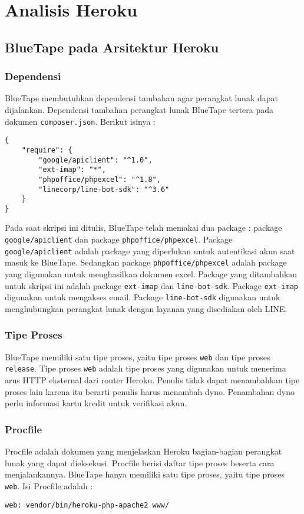\section{Analisis Heroku}
\label{sec:analisisheroku}
\subsection{BlueTape pada Arsitektur Heroku}
\subsubsection{Dependensi}
BlueTape membutuhkan dependensi tambahan agar perangkat lunak dapat dijalankan. Dependensi tambahan perangkat lunak BlueTape tertera pada dokumen \texttt{composer.json}. Berikut isinya :
\begin{lstlisting}
{
    "require": {
        "google/apiclient": "^1.0",
		"ext-imap": "*",
        "phpoffice/phpexcel": "^1.8",
        "linecorp/line-bot-sdk": "^3.6"
    }
}
\end{lstlisting}

Pada saat skripsi ini ditulis, BlueTape telah memakai dua package : package \texttt{google/apiclient} dan package \texttt{phpoffice/phpexcel}. Package \texttt{google/apiclient} adalah package yang diperlukan untuk autentikasi akun saat masuk ke BlueTape. Sedangkan package \texttt{phpoffice/phpexcel} adalah package yang digunakan untuk menghasilkan dokumen excel. Package yang ditambahkan untuk skripsi ini adalah package \texttt{ext-imap} dan \texttt{line-bot-sdk}. Package \texttt{ext-imap} digunakan untuk mengakses email. Package \texttt{line-bot-sdk} digunakan untuk menghubungkan perangkat lunak dengan layanan yang disediakan oleh LINE.

\subsubsection{Tipe Proses}
BlueTape memiliki satu tipe proses, yaitu tipe proses \texttt{web} dan tipe proses \texttt{release}. Tipe proses \texttt{web} adalah tipe proses yang digunakan untuk menerima arus HTTP eksternal dari router Heroku. Penulis tidak dapat menambahkan tipe proses lain karena itu berarti penulis harus menambah dyno. Penambahan dyno perlu informasi kartu kredit untuk verifikasi akun.

\subsubsection{Procfile}
Procfile adalah dokumen yang menjelaskan Heroku bagian-bagian perangkat lunak yang dapat dieksekusi. Procfile berisi daftar tipe proses beserta cara menjalankannya. BlueTape hanya memiliki satu tipe proses, yaitu tipe proses \texttt{web}. Isi Procfile adalah :
\begin{lstlisting}
web: vendor/bin/heroku-php-apache2 www/
\end{lstlisting}

